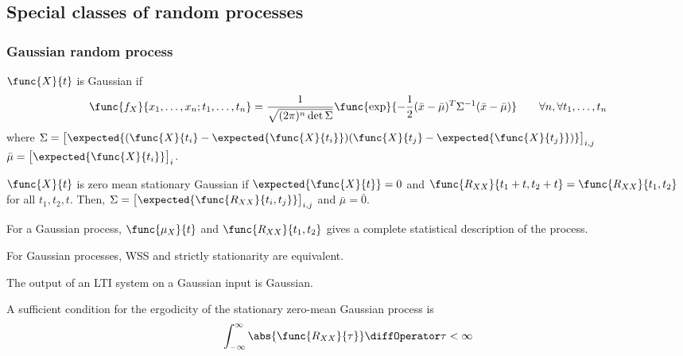 \subsection{Special classes of random processes}
\subsubsection{Gaussian random process}
\(\func{X}{t}\) is Gaussian if 
\begin{equation*}
    \func{f_X}{x_1, \dots, x_n ; t_1, \dots, t_n} = \dfrac{1}{\sqrt{(2 \pi)^n \det \Sigma}} \func{\exp}{- \dfrac{1}{2} (\bar{x} - \bar{\mu})^T \Sigma^{-1} (\bar{x} - \bar{\mu})} \qquad \forall n, \forall t_1, \dots, t_n
\end{equation*}
where \(\Sigma = \begin{bmatrix}
    \expected{(\func{X}{t_i} - \expected{\func{X}{t_i}})(\func{X}{t_j} - \expected{\func{X}{t_j}})}
\end{bmatrix}_{i,j}\)
\(    \bar{\mu} = \begin{bmatrix}
        \expected{\func{X}{t_i}}
    \end{bmatrix}_{i}
\).

\(\func{X}{t}\) is zero mean stationary Gaussian if \(\expected{\func{X}{t}} = 0\) and \(\func{R_{XX}}{t_1 + t,t_2 + t} = \func{R_{XX}}{t_1,t_2}\) for all \(t_1,t_2,t\). Then, \(\Sigma =  \begin{bmatrix}
    \expected{\func{R_{XX}}{t_i,t_j}}
\end{bmatrix}_{i,j}\) and \(\bar{\mu} = \bar{0}\).

\begin{theorem}
    For a Gaussian process, \(\func{\mu_X}{t}\) and \(\func{R_{XX}}{t_1,t_2}\) gives a complete statistical description of the process.
\end{theorem}
\begin{corollary}
    For Gaussian processes, WSS and strictly stationarity are equivalent.
\end{corollary}
\begin{theorem}
    The output of an LTI system on a Gaussian input is Gaussian.
\end{theorem}
\begin{theorem}
    A sufficient condition for the ergodicity of the stationary zero-mean Gaussian process is 
    \begin{equation*}
        \int_{-\infty}^{\infty} \abs{\func{R_{XX}}{\tau}} \diffOperator \tau < \infty 
    \end{equation*}
\end{theorem}



